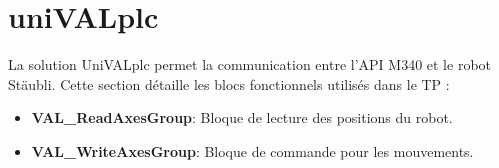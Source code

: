 
\section{uniVALplc}
La solution UniVALplc permet la communication entre l’API M340 et le robot Stäubli. Cette section détaille les
blocs fonctionnels utilisés dans le TP :
\begin{itemize}
    \item \textbf{VAL\_ReadAxesGroup}: Bloque de lecture des positions du robot.
    \item \textbf{VAL\_WriteAxesGroup}: Bloque de commande pour les mouvements.
\end{itemize}
